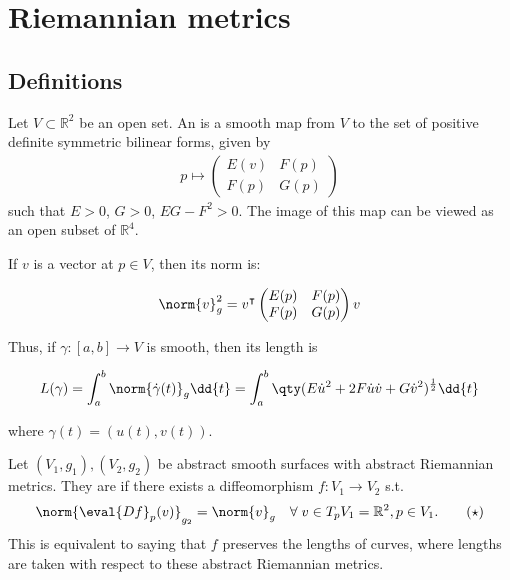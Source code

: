 \section{Riemannian metrics}

\subsection{Definitions}
\begin{definition}
	Let $V \subset \mathbb R^2$ be an open set.
	An  is a smooth map from $V$ to the set of positive definite symmetric bilinear forms, given by
	\begin{align*}
		p \mapsto \begin{pmatrix}
			E(v) & F(p) \\
			F(p) & G(p)
		\end{pmatrix}
	\end{align*}
	such that $E > 0$, $G > 0$, $EG - F^2 > 0$.
	The image of this map can be viewed as an open subset of $\mathbb R^4$.
\end{definition}

If $v$ is a vector at $p \in V$, then its norm is:

\begin{align*}
	\norm{v}_g^2 = v^\tran \begin{pmatrix}
		E(p) & F(p) \\
		F(p) & G(p)
	\end{pmatrix} v
\end{align*}

Thus, if $\gamma \colon [a,b] \to V$ is smooth, then its length is

\begin{align*}
	L(\gamma) = \int_a^b \norm{\dot{\gamma}(t)}_g \dd{t} = \int_a^b \qty( E \dot u^2 + 2F \dot u \dot v + G \dot v^2 )^{\frac{1}{2}} \dd{t}
\end{align*}

where $\gamma(t) = (u(t),v(t))$.

\begin{definition}[Isometric]
	Let $(V_1, g_1), (V_2, g_2)$ be abstract smooth surfaces with abstract Riemannian metrics.
	They are  if there exists a diffeomorphism $f: V_1 \to V_2$ s.t.
	\begin{align*}
		\norm{\eval{Df}_p(v)}_{g_2} = \norm{v}_g \quad \forall \; v \in T_p V_1 = \mathbb{R}^2, p \in V_1. \tag{$\star$}
	\end{align*} 
	This is equivalent to saying that $f$ preserves the lengths of curves, where lengths are taken with respect to these abstract Riemannian metrics.
\end{definition} 

